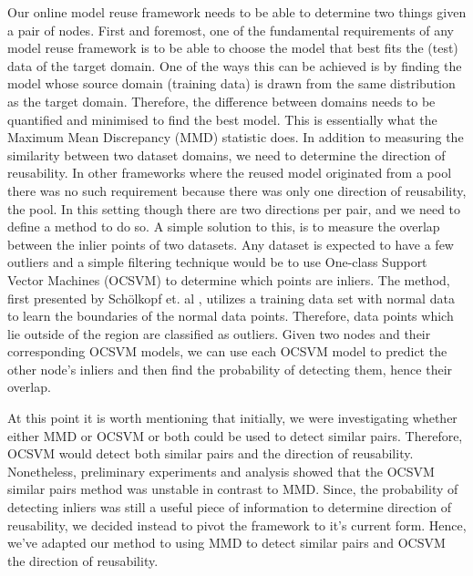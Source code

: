 \documentclass{mprop}
\begin{document}
Our online model reuse framework needs to be able to determine two things given a pair of nodes. First and foremost, one of the fundamental requirements of any model reuse framework is to be able to choose the model that best fits the (test) data of the target domain. One of the ways this can be achieved is by finding the model whose source domain (training data) is drawn from the same distribution as the target domain. Therefore, the difference between domains needs to be quantified and minimised to find the best model. This is essentially what the Maximum Mean Discrepancy (MMD) \cite{OriginalMMD} statistic does. In addition to measuring the similarity between two dataset domains, we need to determine the direction of reusability. In other frameworks where the reused model originated from a pool there was no such requirement because there was only one direction of reusability, the pool. In this setting though there are two directions per pair, and we need to define a method to do so. A simple solution to this, is to measure the overlap between the inlier points of two datasets. Any dataset is expected to have a few outliers and a simple filtering technique would be to use One-class Support Vector Machines (OCSVM) \cite{OriginalOCSVM} to determine which points are inliers.  The method, first presented by Schölkopf et. al \cite{OriginalOCSVM},  utilizes a training data set with normal data to learn the boundaries of the normal data points. Therefore, data points which lie outside of the region are classified as outliers. Given two nodes and their corresponding OCSVM models, we can use each OCSVM model to predict the other node's inliers and then find the probability of detecting them, hence their overlap. 

At this point it is worth mentioning that initially, we were investigating whether either MMD or OCSVM or both could be used to detect similar pairs.  Therefore, OCSVM would detect both similar pairs and the direction of reusability. Nonetheless, preliminary experiments and analysis showed that the OCSVM similar pairs method was unstable in contrast to MMD. Since, the probability of detecting inliers was still a useful piece of information to determine direction of reusability, we decided instead to pivot the framework to it's current form. Hence, we've adapted our method to using MMD to detect similar pairs and OCSVM the direction of reusability. 
\end{document}
